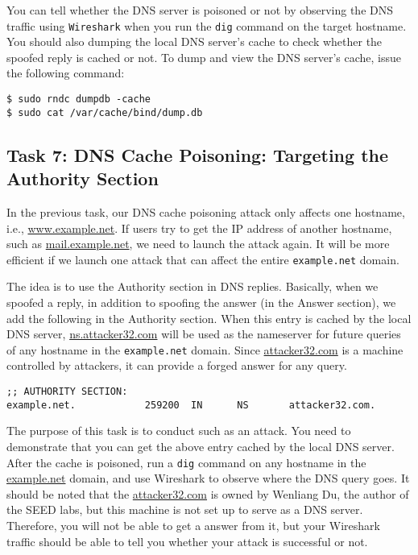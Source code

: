 You can tell whether the DNS server is poisoned or not by observing the DNS
traffic using {\tt Wireshark} when you run the \texttt{dig} command 
on the target hostname. You should also dumping the local DNS server's cache 
to check whether the spoofed reply is cached or not. 
To dump and view the DNS server's cache, issue the following command:


\begin{lstlisting}
$ sudo rndc dumpdb -cache
$ sudo cat /var/cache/bind/dump.db
\end{lstlisting}



\subsection{Task 7: DNS Cache Poisoning: Targeting the Authority Section}

In the previous task, our DNS cache poisoning attack only affects 
one hostname, i.e., \url{www.example.net}. If users try to get the IP
address of another hostname, such as \url{mail.example.net}, we 
need to launch the attack again. It will be more efficient if we launch one
attack that can affect the entire \texttt{example.net} domain.  

The idea is to use the Authority section in DNS replies. 
Basically, when we spoofed a reply, in addition to spoofing the answer (in
the Answer section), we add the following in the Authority section.
When this entry is cached by the local DNS server, \url{ns.attacker32.com}
will be used as the nameserver for future queries of 
any hostname in the \texttt{example.net} domain.  Since 
\url{attacker32.com} is a machine controlled by attackers, it can
provide a forged answer for any query.

\begin{lstlisting}
;; AUTHORITY SECTION:
example.net.            259200  IN      NS       attacker32.com.
\end{lstlisting}
 
 
The purpose of this task is to conduct such as an attack. You need to
demonstrate that you can get the above entry cached by the local DNS 
server. After the cache is poisoned, run a \texttt{dig} command 
on any hostname in the \url{example.net} domain, and use 
Wireshark to observe where the DNS query goes. 
It should be noted that the \url{attacker32.com} is owned by
Wenliang Du, the author of the SEED labs, but this 
machine is not set up to serve as a DNS server. Therefore, you will not be
able to get a answer from it, but your Wireshark traffic should 
be able to tell you whether your attack is successful or not.


